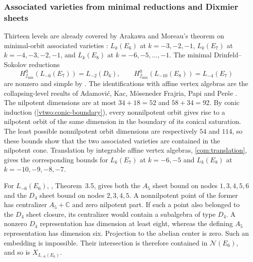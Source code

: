 \documentclass[11pt,a4paper]{amsart}
\numberwithin{equation}{section}
\theoremstyle{definition}
\theoremstyle{remark}
\newcommand{\C}{\mathbb C}
\newcommand{\N}{\mathcal N}
\begin{document}
\subsubsection{Associated varieties from minimal reductions and Dixmier sheets}
\label{exc:positive-geometric}
Thirteen levels are already covered by Arakawa and Moreau's theorem on
minimal-orbit associated varieties \cite[Theorem~1.1(2)]{ArakawaMoreau2018}:
$L_k(E_6)$ at $k=-3,-2,-1$, $L_k(E_7)$ at $k=-4,-3,-2,-1$,
and $L_k(E_8)$ at $k=-6,-5,\ldots,-1$.
The minimal Drinfeld--Sokolov reductions
$$
 H_{f_{\min}}^0(L_{-6}(E_7))=L_{-2}(D_6),\qquad
 H_{f_{\min}}^0(L_{-10}(E_8))=L_{-4}(E_7)
$$
are nonzero and simple by \cite[Theorems~6.1--6.2]{ArakawaMoreau2017}.
The identifications with affine vertex algebras are the collapsing-level
results of Adamovi\'c, Kac, M\"oseneder Frajria, Papi and Per\v se
\cite[Theorem~3.3 and Table~4]{AdamovicEtAl2018}. The nilpotent dimensions are at most $34+18=52$ and
$58+34=92$. By conic induction (\cref{vtwo:conic-boundary}), every
nonnilpotent orbit gives rise to a nilpotent orbit of the same dimension
in the boundary of its conical saturation.
The least possible nonnilpotent orbit dimensions are respectively $54$
and $114$, so these bounds show that the two associated varieties
are contained in the nilpotent cone. Translation by integrable affine
vertex algebras, \cref{com:translation}, gives the corresponding bounds
for $L_k(E_7)$ at $k=-6,-5$ and $L_k(E_8)$ at $k=-10,-9,-8,-7$.

For $L_{-6}(E_6)$, \cite{ArakawaFutornyKrizka2024}, Theorem~3.5, gives both the $A_5$
sheet bound on nodes $1,3,4,5,6$ and the $D_4$ sheet bound on nodes
$2,3,4,5$. A nonnilpotent point of the former has centralizer
$A_5+\C$ and zero nilpotent part. If such a point also belonged to the $D_4$ sheet closure,
its centralizer would contain a subalgebra of type $D_4$. A nonzero $D_4$ representation has dimension
at least eight, whereas the defining $A_5$ representation has dimension
six. Projection to the abelian center is zero. Such an embedding is
impossible. Their intersection is therefore contained in $\N(E_6)$,
and so is $X_{L_{-6}(E_6)}$.
\end{document}
